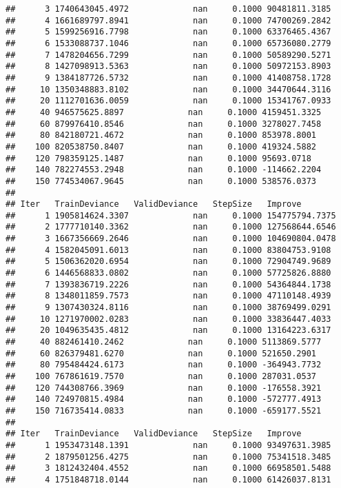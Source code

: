 \documentclass[
]{article}
\begin{document}
\begin{verbatim}
##      3 1740643045.4972             nan     0.1000 90481811.3185
##      4 1661689797.8941             nan     0.1000 74700269.2842
##      5 1599256916.7798             nan     0.1000 63376465.4367
##      6 1533088737.1046             nan     0.1000 65736080.2779
##      7 1478204656.7299             nan     0.1000 50589290.5271
##      8 1427098913.5363             nan     0.1000 50972153.8903
##      9 1384187726.5732             nan     0.1000 41408758.1728
##     10 1350348883.8102             nan     0.1000 34470644.3116
##     20 1112701636.0059             nan     0.1000 15341767.0933
##     40 946575625.8897             nan     0.1000 4159451.3325
##     60 879976410.8546             nan     0.1000 3278027.7458
##     80 842180721.4672             nan     0.1000 853978.8001
##    100 820538750.8407             nan     0.1000 419324.5882
##    120 798359125.1487             nan     0.1000 95693.0718
##    140 782274553.2948             nan     0.1000 -114662.2204
##    150 774534067.9645             nan     0.1000 538576.0373
## 
## Iter   TrainDeviance   ValidDeviance   StepSize   Improve
##      1 1905814624.3307             nan     0.1000 154775794.7375
##      2 1777710140.3362             nan     0.1000 127568644.6546
##      3 1667356669.2646             nan     0.1000 104690804.0478
##      4 1582045091.6013             nan     0.1000 83804753.9108
##      5 1506362020.6954             nan     0.1000 72904749.9689
##      6 1446568833.0802             nan     0.1000 57725826.8880
##      7 1393836719.2226             nan     0.1000 54364844.1738
##      8 1348011859.7573             nan     0.1000 47110148.4939
##      9 1307430324.8116             nan     0.1000 38769499.0291
##     10 1271970002.0283             nan     0.1000 33836447.4033
##     20 1049635435.4812             nan     0.1000 13164223.6317
##     40 882461410.2462             nan     0.1000 5113869.5777
##     60 826379481.6270             nan     0.1000 521650.2901
##     80 795484424.6173             nan     0.1000 -364943.7732
##    100 767861619.7570             nan     0.1000 287031.0537
##    120 744308766.3969             nan     0.1000 -176558.3921
##    140 724970815.4984             nan     0.1000 -572777.4913
##    150 716735414.0833             nan     0.1000 -659177.5521
## 
## Iter   TrainDeviance   ValidDeviance   StepSize   Improve
##      1 1953473148.1391             nan     0.1000 93497631.3985
##      2 1879501256.4275             nan     0.1000 75341518.3485
##      3 1812432404.4552             nan     0.1000 66958501.5488
##      4 1751848718.0144             nan     0.1000 61426037.8131

\end{verbatim}
\end{document}
